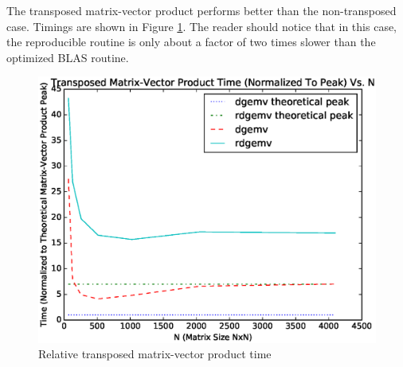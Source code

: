   The transposed matrix-vector product performs better than the non-transposed case. Timings are shown in Figure \ref{fig:gemv_trans_timings}. The reader should notice that in this case, the reproducible routine is only about a factor of two times slower than the optimized BLAS routine.
  \begin{figure}[H]
  \begin{center}
  \includegraphics[width=\textwidth]{plots/gemv_trans_comparison}
  \caption{Relative transposed matrix-vector product time}
  \label{fig:gemv_trans_timings}
  \end{center}
  \end{figure}

